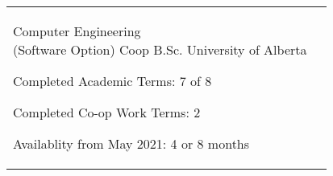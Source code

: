 \documentclass[a4paper]{modernsimplecv}
\begin{document}

\subsection*{}
\vspace{-4em}

\setlength{\columnsep}{0.03\textwidth}
\small
\begin{paracol}{2}
    \begin{minipage}[t]{\leftcolwidth}
        \vspace{1em}
        \section*{}
        \begin{tabular}{@{\raggedright}p{} |>{\raggedright\arraybackslash}p{}}
            \cvdegree
                {2017--2022}
                {Computer Engineering \newline (Software Option) Coop}
                {B.Sc.}
                {University of Alberta}
                {
                    \begin{tabitemize}
                    \item Completed Academic Terms: 7 of 8
                    \item Completed Co-op Work Terms: 2
                    \item Availablity from May 2021: 4 or 8 months
                    \end{tabitemize}
                }\\
        \end{tabular}

        \vspace{-2pt}
        \section*{}
        

\end{minipage}
\end{paracol}
\end{document}
